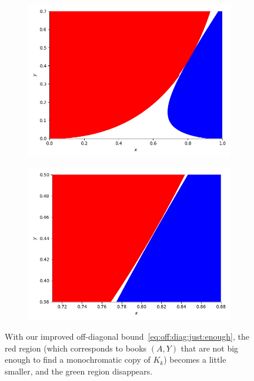 \documentclass[12pt,reqno]{amsart}
\theoremstyle{definition}
\theoremstyle{remark}
\begin{document}
\begin{figure}[h]
  \centering
  \begin{subfigure}[b]{0.46\textwidth}
    \includegraphics[width=\textwidth]{Figure_diagonal.jpeg}
  \end{subfigure}
  \hspace{0.5cm}
  \begin{subfigure}[b]{0.46\textwidth}
    \includegraphics[width=\textwidth]{Fig_diagonal_zoomed_intro.jpeg}  
  \end{subfigure}    
  \vskip-0.2cm
\caption{With our improved off-diagonal bound~\eqref{eq:off:diag:just:enough}, the red region (which corresponds to books $(A,Y)$ that are not big enough to find a monochromatic copy of $K_k$) becomes a little smaller, and the green region disappears.}
\label{fig:diagonal:intro}
\end{figure}
\end{document}
